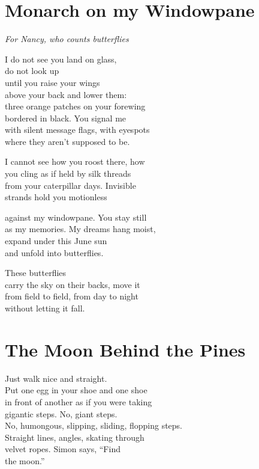 \documentclass[twoside,10pt]{book}
\begin{document}
\clearpage
\section{Monarch on my Windowpane\\
}\emph{For Nancy, who counts butterflies}

I do not see you land on glass,\\
do not look up\\
until you raise your wings\\
above your back and lower them:\\
three orange patches on your forewing\\
bordered in black. You signal me\\
with silent message flags, with eyespots\\
where they aren't supposed to be.

I cannot see how you roost there, how\\
you cling as if held by silk threads\\
from your caterpillar days. Invisible\\
strands hold you motionless

against my windowpane. You stay still\\
as my memories. My dreams hang moist,\\
expand under this June sun\\
and unfold into butterflies.

These butterflies\\
carry the sky on their backs, move it\\
from field to field, from day to night\\
without letting it fall.


\clearpage
\section{The Moon Behind the Pines}

Just walk nice and straight.\\
Put one egg in your shoe and one shoe\\
in front of another as if you were taking\\
gigantic steps. No, giant steps.\\
No, humongous, slipping, sliding, flopping steps.\\
Straight lines, angles, skating through\\
velvet ropes. Simon says, ``Find\\
the moon.''
\end{document}
